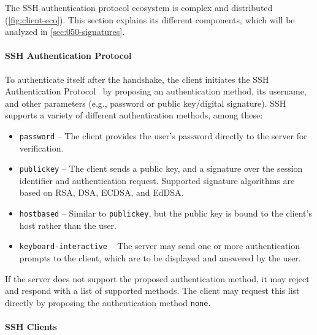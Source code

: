 \label{sec:authentication}

The SSH authentication protocol ecosystem is complex and distributed (\autoref{fig:client-eco}). This section explains its different components, which will be analyzed in \autoref{sec:050-signatures}.

\paragraph{SSH Authentication Protocol}
\label{subsec:SSH-AP}

To authenticate itself after the handshake, the client initiates the SSH Authentication Protocol~\cite{rfc4252} by proposing an authentication method, its username, and other parameters (e.g., password or public key/digital signature). SSH supports a variety of different authentication methods, among these:
\begin{itemize}
    \item \texttt{password} -- The client provides the user's password directly to the server for verification.
    \item \texttt{publickey} -- The client sends a public key, and a signature over the session identifier and authentication request. Supported signature algorithms are based on RSA, DSA, ECDSA, and EdDSA.
    \item \texttt{hostbased} -- Similar to \texttt{publickey}, but the public key is bound to the client's host rather than the user.
    \item \texttt{keyboard-interactive} -- The server may send one or more authentication prompts to the client, which are to be displayed and answered by the user.
\end{itemize}
If the server does not support the proposed authentication method, it may reject and respond with a list of supported methods. The client may request this list directly by proposing the authentication method \verb|none|.

\paragraph{SSH Clients}

